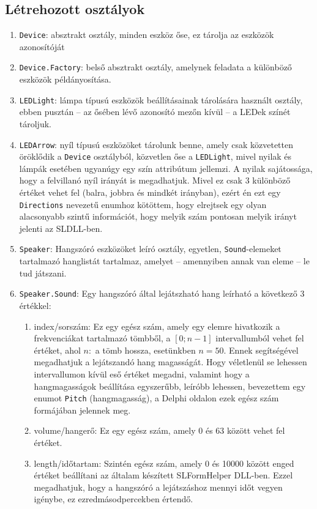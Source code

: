 \documentclass[tocnopagenum]{thesis-ekf}
\begin{document}
	\subsection{Létrehozott osztályok}
	\begin{enumerate}
		\item \verb*|Device|: absztrakt osztály, minden eszköz őse, ez tárolja az eszközök azonosítóját
		\item \verb*|Device.Factory|: belső absztrakt osztály, amelynek feladata a különböző eszközök példányosítása.
		\item \verb*|LEDLight|: lámpa típusú eszközök beállításainak tárolására használt osztály, ebben pusztán -- az ősében lévő azonosító mezőn kívül -- a LEDek színét tároljuk.
		\item \verb*|LEDArrow|: nyíl típusú eszközöket tárolunk benne, amely csak közvetetten öröklődik a \verb*|Device| osztályból, közvetlen őse a \verb*|LEDLight|, mivel nyilak és lámpák esetében ugyanúgy egy szín attribútum jellemzi. A nyilak sajátossága, hogy a felvillanó nyíl irányát is megadhatjuk. Mivel ez csak 3 különböző értéket vehet fel (balra, jobbra és mindkét irányban), ezért én ezt egy \verb*|Directions| nevezetű enumhoz kötöttem, hogy elrejtsek egy olyan alacsonyabb szintű információt, hogy melyik szám pontosan melyik irányt jelenti az SLDLL-ben.
		\item \verb*|Speaker|: Hangszóró eszközöket leíró osztály, egyetlen, \verb*|Sound|-elemeket tartalmazó hanglistát tartalmaz, amelyet -- amennyiben annak van eleme -- le tud játszani.
		\item \verb*|Speaker.Sound|: Egy hangszóró által lejátszható hang leírható a következő 3 értékkel:
		\begin{enumerate} \label{speaker_3ertek}
			\item index/sorszám: Ez egy egész szám, amely egy elemre hivatkozik a frekvenciákat tartalmazó tömbből, a $[0;n-1]$ intervallumból vehet fel értéket, ahol $n: $ a tömb hossza, esetünkben $n=50$.
			Ennek segítségével megadhatjuk a lejátszandó hang magasságát. Hogy véletlenül se lehessen intervallumon kívül eső értéket megadni, valamint hogy a hangmagasságok beállítása egyszerűbb, leíróbb lehessen, bevezettem egy enumot \verb*|Pitch| (hangmagasság), a Delphi oldalon ezek egész szám formájában jelennek meg.
			\item volume/hangerő: Ez egy egész szám, amely 0 és 63 között vehet fel értéket.
			\item length/időtartam: Szintén egész szám, amely 0 és 10000 között enged értéket beállítani az általam készített SLFormHelper DLL-ben. Ezzel megadhatjuk, hogy a hangszóró a lejátszáshoz mennyi időt vegyen igénybe, ez ezredmásodpercekben értendő.
		\end{enumerate}
	\end{enumerate}
\end{document}
